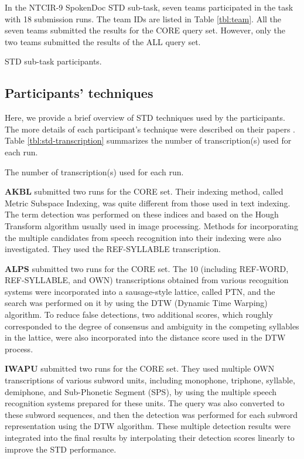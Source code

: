 \documentclass[english]{jnlp_1.4}
\begin{document}
In the NTCIR-9 SpokenDoc STD sub-task, seven teams participated in the task
with 18 submission runs. The team IDs are listed in Table \ref{tbl:team}.
All the seven teams submitted the results for the CORE query set.
However, only the two teams submitted the results of the ALL query set.

\begin{table}[b]
\caption{STD sub-task participants.}
\label{tbl:team}

\end{table}


\subsection{Participants' techniques}

Here, we provide a brief overview of STD techniques used by the
participants. 
The more details of each participant's technique were described on their
papers \cite{AKBL,ALPS,IWAPU,NKGW,NKI11,RYSDT,YLAB}. 
Table \ref{tbl:std-transcription} summarizes the number of transcription(s) 
used for each run.

\begin{table}[b]
\caption{The number of transcription(s) used for each run.}
\label{tbl:std-transcription}

\end{table}

{\bf AKBL} \cite{AKBL} submitted two runs for the CORE set. Their
indexing method, called Metric Subspace Indexing, was quite different
from those used in text indexing. The term detection was performed
on these indices and based on the Hough Transform algorithm usually
used in image processing. Methods for incorporating the multiple
candidates from speech recognition into their indexing were also
investigated. They used the REF-SYLLABLE transcription.

{\bf ALPS} \cite{ALPS} submitted two runs for the CORE set. The 10
(including REF-WORD, REF-SYLLABLE, and OWN) transcriptions obtained
from various recognition systems were incorporated into a
sausage-style lattice, called PTN, and the search was performed on it
by using the DTW (Dynamic Time Warping) algorithm. To reduce false
detections, two additional scores, which roughly corresponded to the
degree of consensus and ambiguity in the competing syllables in the
lattice, were also incorporated into the distance score used in the
DTW process.

{\bf IWAPU} \cite{IWAPU} submitted two runs for the CORE set. They
used multiple OWN transcriptions of various subword units, including
monophone, triphone, syllable, demiphone, and Sub-Phonetic Segment
(SPS),  by using the multiple speech recognition systems prepared for
these units. The query was also converted to these subword sequences,
and then the detection was performed for each subword representation using
the DTW algorithm. These multiple detection results were integrated
into the final results by interpolating their detection scores
linearly to improve the STD performance.
\end{document}
